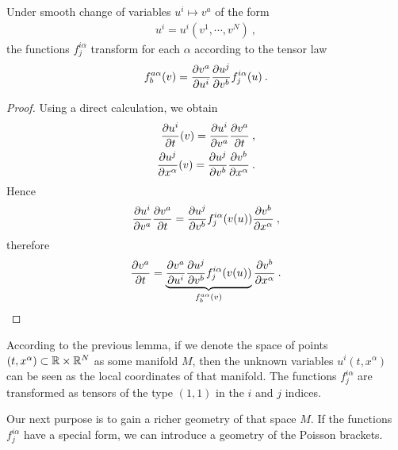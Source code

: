 \begin{proposition} 
    \label{prop:transformace-A} 
    Under smooth change of variables $u^i \mapsto v^a$ of the form
    \begin{align}
        u^i = u^i(v^1,\cdots, v^N) \:,
    \end{align}
    the functions $f^{i\alpha}_{j}$ transform for each $\alpha$ according to the tensor law
    \begin{align}
        f^{a \alpha}_{b}(v) = \frac{\partial v^a}{\partial u^i} \frac{\partial u^j}{\partial v^b} f^{i \alpha}_j (u) \:.
    \end{align}
\end{proposition}
\begin{proof}
    Using a direct calculation, we obtain
    \begin{align}
        \frac{\partial u^i}{\partial t}(v) = \frac{\partial u^i}{\partial v^a} \frac{\partial v^a}{\partial t} \:, \\
        \frac{\partial u^j}{\partial x^\alpha}(v) = \frac{\partial u^j}{\partial v^b} \frac{\partial v^b}{\partial x^\alpha}\:.
    \end{align}
    Hence
    \begin{align}
        \frac{\partial u^i}{\partial v^a} \frac{\partial v^a}{\partial t} = \frac{\partial u^j}{\partial v^b} f^{i \alpha}_j (v(u)) \frac{\partial v^b}{\partial x^\alpha} \:,
    \end{align}
    therefore
    \begin{align}
        \frac{\partial v^a}{\partial t} = \underbrace{\frac{\partial v^a}{\partial u^i} \frac{\partial u^j}{\partial v^b} f^{i \alpha}_j(v(u))}_{f^{a \alpha}_b(v)} \frac{\partial v^b}{\partial x^\alpha} \:.
    \end{align}
\end{proof}

According to the previous lemma, if we denote the space of points $(t,x^\alpha) \subset \mathbb{R} \times \mathbb{R}^N$ as some manifold $M$, then the unknown variables $u^i(t,x^\alpha)$ can be seen as the local coordinates of that manifold. The functions $f^{i \alpha}_j$ are transformed as tensors of the type $(1,1)$ in the $i$ and $j$ indices.

Our next purpose is to gain a richer geometry of that space $M$. If the functions $f^{i \alpha}_j$ have a special form, we can introduce a geometry of the Poisson brackets.

